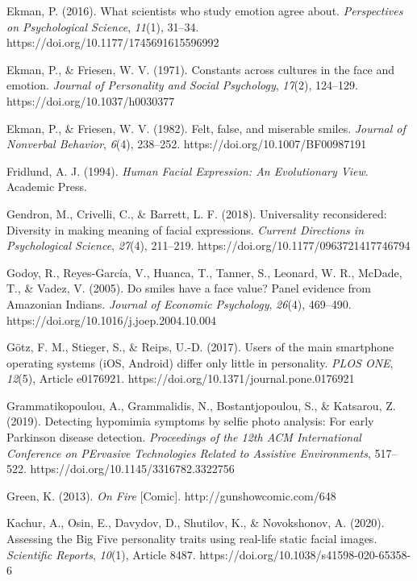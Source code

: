 \documentclass[authordate, empirical,issue]{jote-new-article}
\begin{document}
Ekman, P. (2016). What scientists who study emotion agree about. \emph{Perspectives on Psychological Science}, \emph{11}(1), 31--34. https://doi.org/10.1177/1745691615596992



Ekman, P., \& Friesen, W. V. (1971). Constants across cultures in the face and emotion. \emph{Journal of Personality and Social Psychology}, \emph{17}(2), 124--129. https://doi.org/10.1037/h0030377



Ekman, P., \& Friesen, W. V. (1982). Felt, false, and miserable smiles. \emph{Journal of Nonverbal Behavior}, \emph{6}(4), 238--252. https://doi.org/10.1007/BF00987191



Fridlund, A. J. (1994). \emph{Human Facial Expression: An Evolutionary View}. Academic Press.



Gendron, M., Crivelli, C., \& Barrett, L. F. (2018). Universality reconsidered: Diversity in making meaning of facial expressions. \emph{Current Directions in Psychological Science}, \emph{27}(4), 211--219. https://doi.org/10.1177/0963721417746794



Godoy, R., Reyes-García, V., Huanca, T., Tanner, S., Leonard, W. R., McDade, T., \& Vadez, V. (2005). Do smiles have a face value? Panel evidence from Amazonian Indians. \emph{Journal of Economic Psychology}, \emph{26}(4), 469--490. https://doi.org/10.1016/j.joep.2004.10.004



Götz, F. M., Stieger, S., \& Reips, U.-D. (2017). Users of the main smartphone operating systems (iOS, Android) differ only little in personality. \emph{PLOS ONE}, \emph{12}(5), Article e0176921. https://doi.org/10.1371/journal.pone.0176921



Grammatikopoulou, A., Grammalidis, N., Bostantjopoulou, S., \& Katsarou, Z. (2019). Detecting hypomimia symptoms by selfie photo analysis: For early Parkinson disease detection. \emph{Proceedings of the 12th ACM International Conference on }\emph{PErvasive}\emph{ Technologies Related to Assistive Environments}, 517--522. https://doi.org/10.1145/3316782.3322756



Green, K. (2013). \emph{On Fire} [Comic]. http://gunshowcomic.com/648



Kachur, A., Osin, E., Davydov, D., Shutilov, K., \& Novokshonov, A. (2020). Assessing the Big Five personality traits using real-life static facial images. \emph{Scientific Reports}, \emph{10}(1), Article 8487. https://doi.org/10.1038/s41598-020-65358-6
\end{document}
